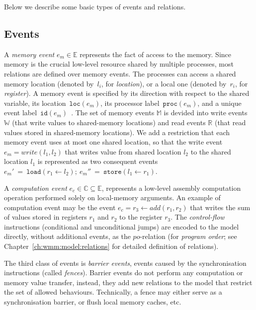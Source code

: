 Below we describe some basic types of events and relations.

\subsection{Events}
\label{ch:wmm:model:events}

A \textit{memory event} $e_m \in \mathbb{E}$ represents the fact of access to the memory. Since memory is the crucial low-level resource shared by multiple processes, most relations are defined over memory events. 
The processes can access a shared memory location (denoted by~$l_i$, for \textit{location}), or a local one (denoted by~$r_i$, for \textit{register}). A memory event is specified by its direction with respect to the shared variable, its location~$\texttt{loc}(e_m)$, its processor label~$\texttt{proc}(e_m)$, and a unique event label~$\texttt{id}(e_m)$~\cite{alglave2010shared}. 
The set of memory events $\mathbb{M}$ is devided into write events $\mathbb{W}$ (that write values to shared-memory locations) and read events $\mathbb{R}$ (that read values stored in shared-memory locations).
We add a restriction that each memory event uses at most one shared location, so that the write event $e_m = write(l_1, l_2)$ that writes value from shared location $l_2$ to the shared location $l_1$ is represented as two consequent events $e_m'~=~\texttt{load}(r_1 \leftarrow l_2); \ e_m''~=~\texttt{store}(l_1 \leftarrow r_1)$.

A \textit{computation event} $e_c \in \mathbb{C} \subseteq \mathbb{E}$, represents a low-level assembly computation operation performed solely on local-memory arguments. An example of computation event may be the event $e_c = r_3 \leftarrow add(r_1, r_2)$ that writes the sum of values stored in registers $r_1$ and $r_2$ to the register $r_3$. The \textit{control-flow} instructions (conditional and unconditional jumps) are encoded to the model directly, without additional events, as the $po$-relation (for \textit{program order}; see Chapter~\ref{ch:wmm:model:relations} for detailed definition of relations).

The third class of events is \textit{barrier events}, events caused by the synchronisation instructions (called \textit{fences}). Barrier events do not perform any computation or memory value transfer, instead, they add new relations to the model that restrict the set of allowed behaviours. Technically, a fence may either serve as a synchronisation barrier, or flush local memory caches, etc.


